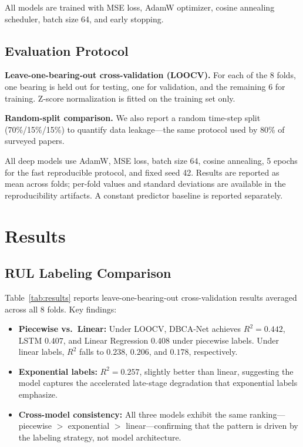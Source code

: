 \documentclass[5p,twocolumn]{elsarticle}
\begin{document}
All models are trained with MSE loss, AdamW optimizer, cosine annealing scheduler, batch size 64, and early stopping.

\subsection{Evaluation Protocol}

\textbf{Leave-one-bearing-out cross-validation (LOOCV).} For each of the 8 folds, one bearing is held out for testing, one for validation, and the remaining 6 for training. Z-score normalization is fitted on the training set only.

\textbf{Random-split comparison.} We also report a random time-step split (70\%/15\%/15\%) to quantify data leakage---the same protocol used by 80\% of surveyed papers.

All deep models use AdamW, MSE loss, batch size 64, cosine annealing, 5 epochs for the fast reproducible protocol, and fixed seed 42. Results are reported as mean across folds; per-fold values and standard deviations are available in the reproducibility artifacts. A constant predictor baseline is reported separately.


\section{Results}
\label{sec:results}

\subsection{RUL Labeling Comparison}

Table~\ref{tab:results} reports leave-one-bearing-out cross-validation results averaged across all 8 folds. Key findings:

\begin{itemize}
    \item \textbf{Piecewise vs.\ Linear:} Under LOOCV, DBCA-Net achieves $R^2 = 0.442$, LSTM $0.407$, and Linear Regression $0.408$ under piecewise labels. Under linear labels, $R^2$ falls to $0.238$, $0.206$, and $0.178$, respectively.
    \item \textbf{Exponential labels:} $R^2 = 0.257$, slightly better than linear, suggesting the model captures the accelerated late-stage degradation that exponential labels emphasize.
    \item \textbf{Cross-model consistency:} All three models exhibit the same ranking---piecewise $>$ exponential $>$ linear---confirming that the pattern is driven by the labeling strategy, not model architecture.
\end{itemize}
\end{document}
